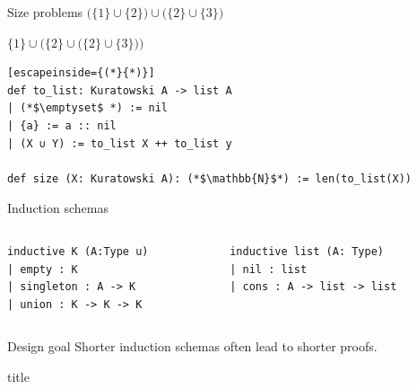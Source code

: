 \documentclass[aspectratio=169]{beamer}
\begin{document}
\begin{frame}[fragile]{Size problems}
    $\bigl( \{1\} \cup \{2\} \bigr) \cup \bigl( \{2\} \cup \{3\} \bigr) $



    $ \{1\} \cup \bigl( \{2\} \cup \bigl( \{2\} \cup \{3\} \bigr) \bigr) $
\pause
\begin{lstlisting}[escapeinside={(*}{*)}]
def to_list: Kuratowski A -> list A
| (*$\emptyset$ *) := nil
| {a} := a :: nil
| (X ∪ Y) := to_list X ++ to_list y

def size (X: Kuratowski A): (*$\mathbb{N}$*) := len(to_list(X))
\end{lstlisting}
\end{frame}

\begin{frame}[fragile]{Induction schemas}
    \begin{columns}[T]
        \begin{column}{0.5\textwidth}
            \begin{lstlisting}
inductive K (A:Type u)
| empty : K
| singleton : A -> K
| union : K -> K -> K
            \end{lstlisting}
        \end{column}
        
        \begin{column}{0.5\textwidth}
            \begin{lstlisting}
inductive list (A: Type)
| nil : list
| cons : A -> list -> list
            \end{lstlisting}
        \end{column}
    \end{columns}
    \begin{block}{Design goal}
        Shorter induction schemas often lead to shorter proofs.
    \end{block}
\end{frame}

\begin{frame}{title}
    
\end{frame}
    
\end{document}
